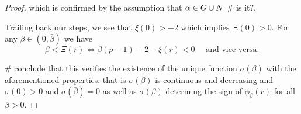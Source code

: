 \begin{proof}
which is confirmed by the assumption that $\alpha\in G\cup N$ \# is it?.

Trailing back our steps, we see that $\xi(0)>-2$ which implies $\Xi(0)>0$. For
any $\beta\in(0,\bar{\beta})$ we have
$$\beta<\Xi(r)\iff\beta(p-1)-2-\xi(r)<0\quad\text{ and vice versa.}$$ 

\# conclude that this verifies the existence of the unique function
$\sigma(\beta)$ with the aforementioned properties. that is $\sigma(\beta)$ is
continuous and decreasing and $\sigma(0)>0$ and $\sigma(\bar{\beta})=0$ as well
as $\sigma(\beta)$ determing the sign of $\phi_\beta(r)$ for all $\beta>0$.

\end{proof}

